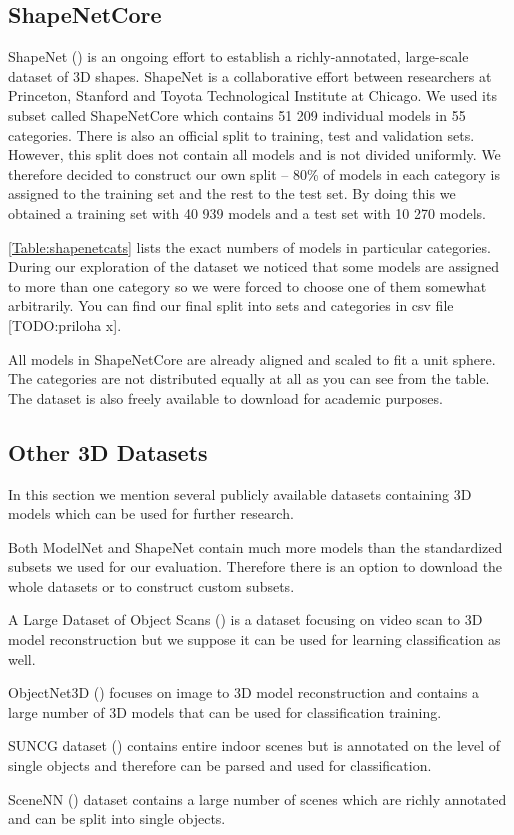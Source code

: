 \subsection{ShapeNetCore}
ShapeNet (\cite{chang_shapenet:_2015}) is an ongoing effort to establish a richly-annotated, large-scale dataset of 3D shapes. ShapeNet is a collaborative effort between researchers at Princeton, Stanford and Toyota Technological Institute at Chicago. We used its subset called ShapeNetCore which contains 51 209 individual models in 55 categories. There is also an official split to training, test and validation sets. However, this split does not contain all models and is not divided uniformly. We therefore decided to construct our own split -- 80\% of models in each category is assigned to the training set and the rest to the test set. By doing this we obtained a training set with 40 939 models and a test set with 10 270 models. \par \autoref{Table:shapenetcats} lists the exact numbers of models in particular categories. During our exploration of the dataset we noticed that some models are assigned to more than one category so we were forced to choose one of them somewhat arbitrarily. You can find our final split into sets and categories in csv file [TODO:priloha x].\par



All models in ShapeNetCore are already aligned and scaled to fit a unit sphere. The categories are not distributed equally at all as you can see from the table. The dataset is also freely available to download for academic purposes.




\subsection{Other 3D Datasets}
In this section we mention several publicly available datasets containing 3D models which can be used for further research. \par
Both ModelNet and ShapeNet contain much more models than the standardized subsets we used for our evaluation. Therefore there is an option to download the whole datasets or to construct custom subsets. \par
A Large Dataset of Object Scans (\cite{choi_large_2016}) is a dataset focusing on video scan to 3D model reconstruction but we suppose it can be used for learning classification as well.  \par
ObjectNet3D (\cite{xiang_objectnet3d:_2016}) focuses on image to 3D model reconstruction and contains a large number of 3D models that can be used for classification training.\par
SUNCG dataset (\cite{song_semantic_2017}) contains entire indoor scenes but is annotated on the level of single objects and therefore can be parsed and used for classification. \par
SceneNN (\cite{hua_scenenn:_2016}) dataset contains a large number of scenes which are richly annotated and can be split into single objects.

